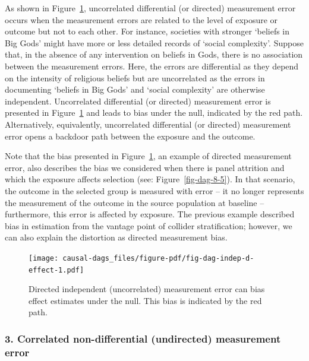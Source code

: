 \documentclass[
  singlecolumn]{report}
\begin{document}
As shown in Figure~\ref{fig-dag-indep-d-effect}, uncorrelated
differential (or directed) measurement error occurs when the measurement
errors are related to the level of exposure or outcome but not to each
other. For instance, societies with stronger `beliefs in Big Gods' might
have more or less detailed records of `social complexity'. Suppose that,
in the absence of any intervention on beliefs in Gods, there is no
association between the measurement errors. Here, the errors are
differential as they depend on the intensity of religious beliefs but
are uncorrelated as the errors in documenting `beliefs in Big Gods' and
`social complexity' are otherwise independent. Uncorrelated differential
(or directed) measurement error is presented in
Figure~\ref{fig-dag-indep-d-effect} and leads to bias under the null,
indicated by the red path. Alternatively, equivalently, uncorrelated
differential (or directed) measurement error opens a backdoor path
between the exposure and the outcome.

Note that the bias presented in Figure~\ref{fig-dag-indep-d-effect}, an
example of directed measurement error, also describes the bias we
considered when there is panel attrition and which the exposure affects
selection (see: Figure~\ref{fig-dag-8-5}). In that scenario, the outcome
in the selected group is measured with error -- it no longer represents
the measurement of the outcome in the source population at baseline --
furthermore, this error is affected by exposure. The previous example
described bias in estimation from the vantage point of collider
stratification; however, we can also explain the distortion as directed
measurement bias.

\begin{figure}

{\centering \texttt{[image: causal-dags\_files/figure-pdf/fig-dag-indep-d-effect-1.pdf]}

}

\caption{\label{fig-dag-indep-d-effect}Directed independent
(uncorrelated) measurement error can bias effect estimates under the
null. This bias is indicated by the red path.}

\end{figure}

\hypertarget{correlated-non-differential-undirected-measurement-error}{%
\subsubsection{\texorpdfstring{3. \textbf{Correlated non-differential
(undirected) measurement
error}}{3. Correlated non-differential (undirected) measurement error}}\label{correlated-non-differential-undirected-measurement-error}}
\end{document}
